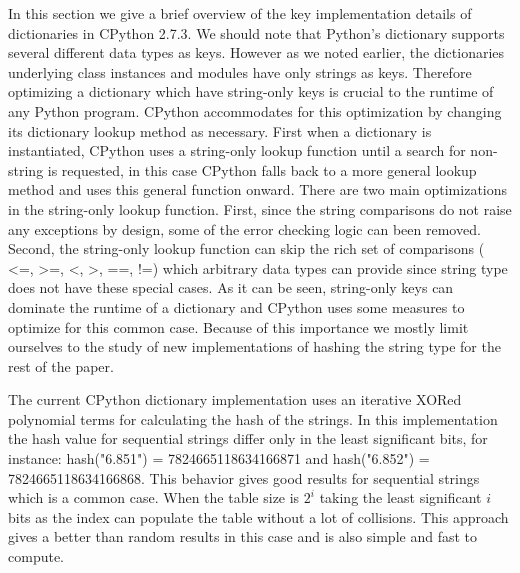 \documentclass[12pt]{article}
\begin{document}
In this section we give a brief overview of the key implementation details of dictionaries in CPython 2.7.3.
We should note that Python’s dictionary supports several different data types as keys. However as we noted earlier, the dictionaries underlying class instances and modules have only strings as keys. Therefore optimizing a dictionary which have string-only keys is crucial to the runtime of any Python program. CPython accommodates for this optimization by changing its dictionary lookup method as necessary. First when a dictionary is instantiated, CPython uses a string-only lookup function until a search for non-string is requested, in this case CPython falls back to a more general lookup method and uses this general function onward. There are two main optimizations in the string-only lookup function. First, since the string comparisons do not raise any exceptions by design, some of the error checking logic can been removed. Second, the string-only lookup function can skip the rich set of comparisons ( <=, >=, <, >, ==, !=) which arbitrary data types can provide since string type does not have these special cases.  As it can be seen, string-only keys can dominate the runtime of a dictionary and CPython uses some measures to optimize for this common case. Because of this importance we mostly limit ourselves to the study of new implementations of hashing the string type for the rest of the paper.

The current CPython dictionary implementation uses an iterative XORed polynomial terms for calculating the hash of the strings. In this implementation the hash value for sequential strings differ only in the least significant bits, for instance: hash("6.851") = 7824665118634166871 and hash("6.852") = 7824665118634166868. This behavior gives good results for sequential strings which is a common case. When the table size is $2^i$ taking the least significant $i$ bits as the index can populate the table without a lot of collisions. This approach gives a better than random results in this case and is also simple and fast to compute.
\end{document}
